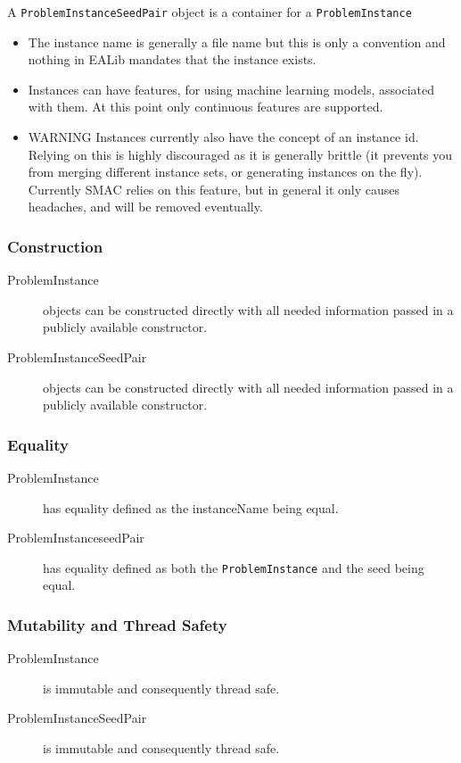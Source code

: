 \documentclass[11pt,letterpaper,oneside]{article}
\begin{document}
A \texttt{ProblemInstanceSeedPair} object is a container for a \texttt{ProblemInstance}




\begin{itemize}
\item The instance name is generally a file name but this is only a convention and nothing in EALib mandates that the instance exists.
\item Instances can have features, for using machine learning models, associated with them. At this point only continuous features are supported.
\item \textsc{WARNING} Instances currently also have the concept of an instance id. Relying on this is highly discouraged as it is generally brittle (it prevents you from merging different instance sets, or generating instances on the fly). Currently SMAC relies on this feature, but in general it only causes headaches, and will be removed eventually.

\end{itemize}

\subsubsection{Construction}
\begin{description}
\item[ProblemInstance] objects can be constructed directly with all needed information passed in a publicly available constructor.
\item[ProblemInstanceSeedPair] objects can be constructed directly with all needed information passed in a publicly available constructor.
\end{description}


\subsubsection{Equality}
\begin{description}
\item[ProblemInstance] has equality defined as the instanceName being equal.
\item[ProblemInstanceseedPair] has equality defined as both the \texttt{ProblemInstance} and the seed being equal.
\end{description}

\subsubsection{Mutability and Thread Safety}
\begin{description}
\item[ProblemInstance] is immutable and consequently thread safe.
\item[ProblemInstanceSeedPair] is immutable and consequently thread safe.
\end{description}
\end{document}
